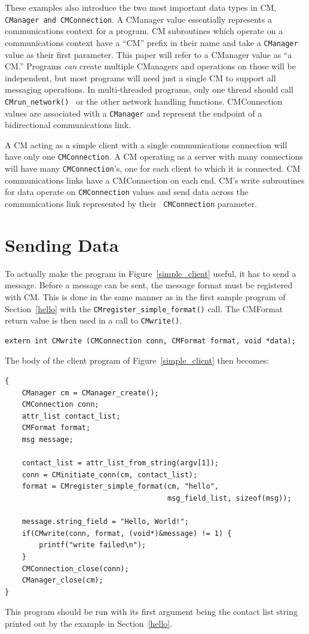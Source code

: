 \documentclass[11pt]{article}
\begin{document}
These examples also introduce the two most important data types in
CM, {\tt CManager and CMConnection}.  A CManager value essentially
represents a communications context for a program.  CM subroutines
which operate on a communications context have a ``CM'' prefix in
their name and take a {\tt CManager} value as their first parameter.  This
paper will refer to a CManager value as ``a CM.''  Programs {\it can}
create multiple CManagers and operations on those will be independent, but
most programs will need just a single CM to support all messaging
operations.  In multi-threaded programs, only one thread should call
{\tt CMrun\_network() } or the other network handling functions.
CMConnection values are associated with a {\tt CManager} and represent the
endpoint of a bidirectional communications link.  

A CM acting as a simple client with a single communications connection will
have only one {\tt CMConnection}.  A CM operating as a server with many
connections will have many {\tt CMConnection}'s, one for each client to
which it is connected.  CM communications links have a CMConnection on each
end.   CM's write subroutines for data operate on {\tt CMConnection} values
and send data across the communications link represented by their {\tt
CMConnection} parameter.  

\section{Sending Data\label{send}}

To actually make the program in Figure~\ref{simple_client} useful, it has to
send a message.  Before a message can be sent, the message format must be
registered with CM.  This is done in the same manner as in the first sample
program of Section~\ref{hello} with the {\tt CMregister\_simple\_format()} call.
The CMFormat return value is then used in a call to {\tt CMwrite()}.
\begin{Verbatim}
extern int CMwrite (CMConnection conn, CMFormat format, void *data);
\end{Verbatim}
The body of the client program of Figure~\ref{simple_client} then becomes:\\
\begin{center}
\begin{BVerbatim}
{
    CManager cm = CManager_create();
    CMConnection conn;
    attr_list contact_list;
    CMFormat format;
    msg	message;

    contact_list = attr_list_from_string(argv[1]);
    conn = CMinitiate_conn(cm, contact_list);
    format = CMregister_simple_format(cm, "hello", 
                                      msg_field_list, sizeof(msg));

    message.string_field = "Hello, World!";
    if(CMwrite(conn, format, (void*)&message) != 1) {
        printf("write failed\n");
    }
    CMConnection_close(conn);
    CManager_close(cm);
}
\end{BVerbatim}
\end{center}
This program should be run with its first argument being the contact list
string printed out by the example in Section~\ref{hello}.  
\end{document}
